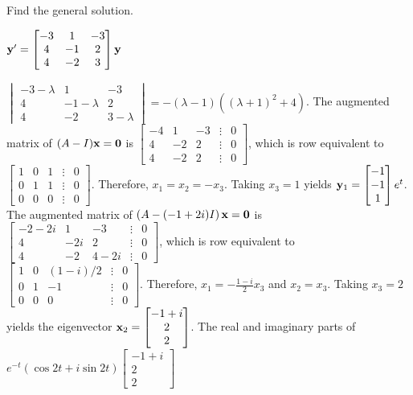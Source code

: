 \documentclass{ximera}
\begin{document}
 \begin{problem}\label{exer:10.6.8}
 Find the general solution.
 
 $ {\bf
y}'= \begin{bmatrix}-3&1&-3\\4&-1&2\\4&-2&3\end{bmatrix}{\bf y}$

\begin{solution}
    $\begin{vmatrix}-3-\lambda&1&-3\\4&-1-\lambda&2\\4
&-2&3-\lambda\end{vmatrix}=-(\lambda-1)\left((\lambda+1)^2+4\right)$.
 The augmented matrix of $(A-I){\bf x=0}$ is
$ \begin{bmatrix}-4&1&-3&\vdots&0\\4&-2&2&\vdots&0\\
4&-2&2&\vdots&0 \end{bmatrix}$,
which is row equivalent to
$ \begin{bmatrix} 1&0&1&\vdots&0\\ 0&1&1&
\vdots&0\\ 0&0&0&\vdots&0 \end{bmatrix}$.
Therefore,   $x_1=x_2=-x_3$.  Taking $x_3=1$ yields
${\bf y}_1= \begin{bmatrix}-1\\-1\\1 \end{bmatrix}e^t$. The augmented matrix of
$\left(A-(-1+2i)I\right){\bf x=0}$ is
$ \begin{bmatrix}-2-2i&1&-3&\vdots&0\\4&-2i&2&\vdots&0\\
4&-2&4-2i&\vdots&0 \end{bmatrix}$,
which is row equivalent to
$ \begin{bmatrix} 1&0&(1-i)/2&\vdots&0\\
0&1&-1&\vdots&0\\ 0&0&0&\vdots&0 \end{bmatrix}$.
Therefore,   $x_1=-\frac{1-i}{2}x_3$ and $x_2=x_3$.
Taking $x_3=2$ yields the eigenvector
${\bf x}_2= \begin{bmatrix}-1+i\\2\\2 \end{bmatrix}$.
The real and imaginary parts of
$e^{-t}(\cos2t+i\sin2t) \begin{bmatrix}-1+i\\2\\2 \end{bmatrix}$

\end{solution}
\end{problem}
\end{document}
